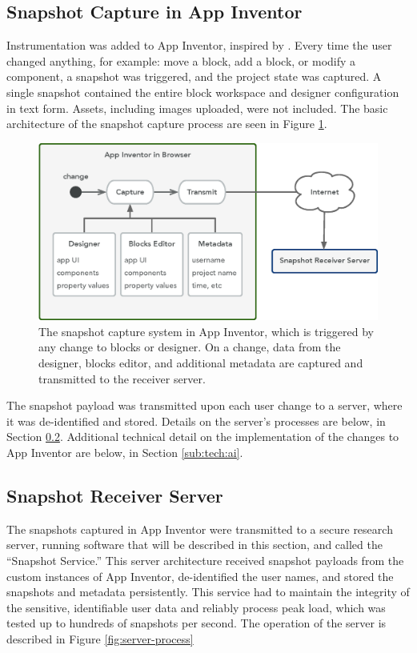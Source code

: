 \subsection{Snapshot Capture in App Inventor}
\label{sec:mod-ai}
Instrumentation was added to App Inventor, inspired by \citet{piech-2012}. Every time the user changed anything, for example: move a block, add a block, or modify a component, a snapshot was triggered, and the project state was captured. A single snapshot contained the entire block workspace and designer configuration in text form. Assets, including images uploaded, were not included. The basic architecture of the snapshot capture process are seen in Figure \ref{fig:snapshot-arch}.

\begin{figure}
  \centering
      \includegraphics[width=\textwidth]{diagrams/architecture}
  \caption[Snapshot capture design diagram]{The snapshot capture system in App Inventor, which is triggered by any change to blocks or designer. On a change, data from the designer, blocks editor, and additional metadata are captured and transmitted to the receiver server.}
  \label{fig:snapshot-arch}
\end{figure}

The snapshot payload was transmitted upon each user change to a server, where it was de-identified and stored. Details on the server's processes are below, in Section \ref{sec:server}. Additional technical detail on the implementation of the changes to App Inventor are below, in Section \ref{sub:tech:ai}.

\subsection{Snapshot Receiver Server}
\label{sec:server}
The snapshots captured in App Inventor were transmitted to a secure research server, running software that will be described in this section, and called the ``Snapshot Service.'' This server architecture received snapshot payloads from the custom instances of App Inventor, de-identified the user names, and stored the snapshots and metadata persistently. This service had to maintain the integrity of the sensitive, identifiable user data and reliably process peak load, which was tested up to hundreds of snapshots per second. The operation of the server is described in Figure \ref{fig:server-process}


